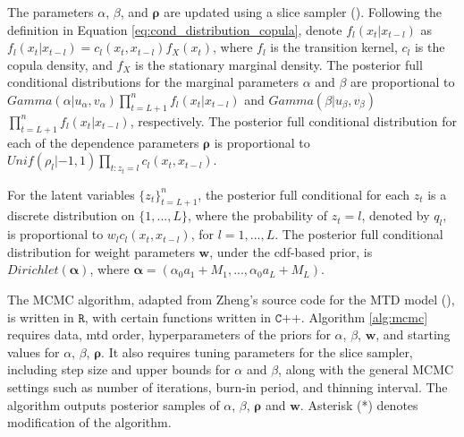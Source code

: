 \documentclass[
  letterpaper,
  double,
  12pt,
  1.0in]{beavtex}
\begin{document}
The parameters \(\alpha\), \(\beta\), and \(\boldsymbol{\rho}\) are
updated using a slice sampler ().
Following the definition in Equation \ref{eq:cond_distribution_copula},
denote \(f_l (x_t | x_{t-l})\) as
\(f_l (x_t | x_{t-l}) = c_l (x_t, x_{t-l}) f_X(x_t)\), where \(f_l\) is
the transition kernel, \(c_l\) is the copula density, and \(f_X\) is the
stationary marginal density. The posterior full conditional
distributions for the marginal parameters \(\alpha\) and \(\beta\) are
proportional to
\(Gamma(\alpha | u_{\alpha}, v_{\alpha}) \prod_{t=L+1}^n f_l (x_t | x_{t-l})\)
and \(Gamma(\beta | u_{\beta}, v_{\beta})\)
\(\prod_{t=L+1}^n f_l (x_t | x_{t-l})\), respectively. The posterior
full conditional distribution for each of the dependence parameters
\(\boldsymbol{\rho}\) is proportional to
\(Unif(\rho_l |-1, 1) \prod_{t:z_t = l} c_l (x_t, x_{t-l})\).

For the latent variables \({\{z_t\}}_{t=L+1}^n\), the posterior full
conditional for each \(z_t\) is a discrete distribution on
\(\{1, ..., L\}\), where the probability of \(z_t = l\), denoted by
\(q_l\), is proportional to \(w_l c_l (x_t, x_{t-l})\), for
\(l = 1,..., L\). The posterior full conditional distribution for weight
parameters \(\boldsymbol{w}\), under the cdf-based prior, is
\(Dirichlet (\boldsymbol{\alpha})\), where
\(\boldsymbol{\alpha} = (\alpha_0 a_1 + M_1, ..., \alpha_0 a_L + M_L)\).

The MCMC algorithm, adapted from Zheng's source code for the MTD model
(),
is written in \(\texttt{R}\), with certain functions written in
\(\texttt{C++}\). Algorithm \ref{alg:mcmc} requires data, mtd order,
hyperparameters of the priors for \(\alpha\), \(\beta\),
\(\boldsymbol{w}\), and starting values for \(\alpha\), \(\beta\),
\(\boldsymbol{\rho}\). It also requires tuning parameters for the slice
sampler, including step size and upper bounds for \(\alpha\) and
\(\beta\), along with the general MCMC settings such as number of
iterations, burn-in period, and thinning interval. The algorithm outputs
posterior samples of \(\alpha\), \(\beta\), \(\boldsymbol{\rho}\) and
\(\boldsymbol{w}\). Asterisk (*) denotes modification of the algorithm.
\end{document}
